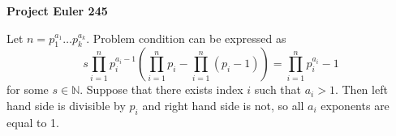 \documentclass[a4paper,12pt]{article}
\begin{document}
\setlength\parindent{0pt}
\textbf{Project Euler 245}
\vspace{5ex}

Let \(n = p_1^{a_1} \dots p_k^{a_k}\). Problem condition can be expressed as
\[s \prod_{i = 1}^n p_i^{a_i - 1} \left(\prod_{i = 1}^n p_i - \prod_{i = 1}^n (p_i - 1)\right) = \prod_{i = 1}^n p_i^{a_i} - 1\]
for some \(s \in \mathbb{N}\). Suppose that there exists index \(i\) such that \(a_i > 1\). Then left hand side is divisible by \(p_i\) and right hand side is not, so all \(a_i\) exponents are equal to 1.
\end{document}

